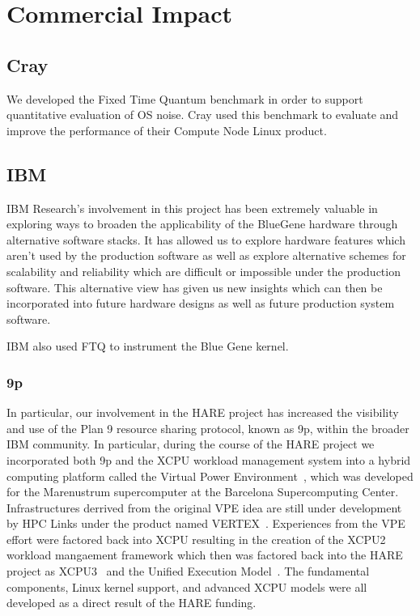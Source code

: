 \chapter{Commercial Impact}
\section{Cray}
We developed the Fixed Time Quantum\cite{ftq} benchmark in order to support quantitative evaluation of 
OS noise. Cray used this benchmark to evaluate and improve the performance of their Compute Node
Linux product\cite{kaplan2007cray}. 

\section{IBM}
IBM Research's involvement in this project has been extremely valuable in exploring
ways to broaden the applicability of the BlueGene hardware through alternative software
stacks.  It has allowed us to explore hardware features which aren't used by the production
software as well as explore alternative schemes for scalability and reliability which are
difficult or impossible under the production software.  This alternative view has given us
new insights which can then be incorporated into future hardware designs as well as future
production system software.

IBM also used FTQ to instrument the Blue Gene kernel\cite{bgpftq}.

\subsection{9p}

In particular, our involvement in the HARE project has increased the visibility and use
of the Plan 9 resource sharing protocol, known as 9p, within the broader IBM community.
In particular, during the course of the HARE project we incorporated both 9p and the XCPU
workload management system into a hybrid computing platform called the Virtual Power
Environment~\cite{VPE}, which was developed for the Marenustrum supercomputer at the Barcelona 
Supercomputing Center.  Infrastructures derrived from the original VPE idea are still
under development by HPC Links under the product named VERTEX~\cite{vertex}.
Experiences from the VPE effort were factored back into XCPU
resulting in the creation of the XCPU2~\cite{xcpu2} workload mangaement framework which then was
factored back into the HARE project as XCPU3~\cite{xcpu3} and the 
Unified Execution Model~\cite{uem}.  The fundamental components, Linux kernel support, and
advanced XCPU models were all developed as a direct result of the HARE funding.

